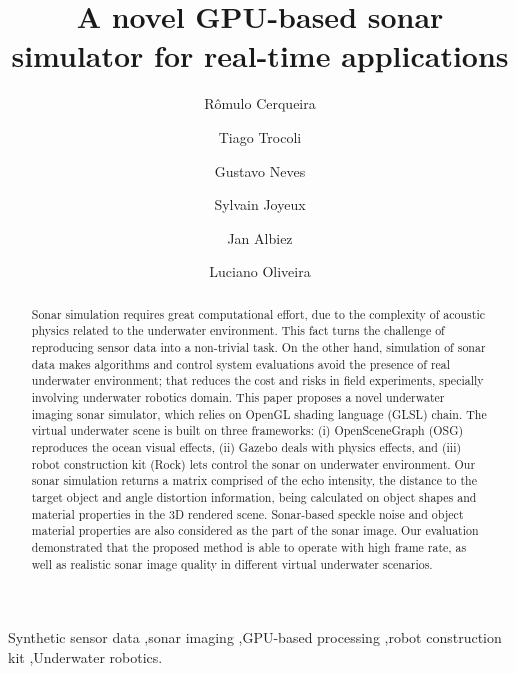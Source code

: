 \documentclass[final,5p,times]{elsarticle}
\begin{document}
\begin{frontmatter}


\title{A novel GPU-based sonar simulator for real-time applications}

\author[senai,ufba]{Rômulo Cerqueira} 
\author[senai]{Tiago Trocoli} 
\author[senai]{Gustavo Neves}
\author[senai]{Sylvain Joyeux}
\author[senai,dfki]{Jan Albiez}
\author[ufba]{Luciano Oliveira}

\address[senai]{Brazilian Institute of Robotics, SENAI CIMATEC, Salvador, Bahia, Brazil}
\address[ufba]{Intelligent Vision Research Lab, Federal University of Bahia, Salvador, Bahia, Brazil}
\address[dfki]{Robotics Innovation Center, DFKI GmbH, Bremen, Germany}

\begin{abstract}

Sonar simulation requires great computational effort, due to the complexity of acoustic physics related to the underwater environment. This fact turns the challenge of reproducing sensor data into a non-trivial task. On the other hand, simulation of sonar data makes algorithms and control system evaluations avoid the presence of real underwater environment; that reduces the cost and risks in field experiments, specially involving underwater robotics domain. This paper proposes a novel underwater imaging sonar simulator, which relies on OpenGL shading language (GLSL) chain. The virtual underwater scene is built on three frameworks: (i) OpenSceneGraph (OSG) reproduces the ocean visual effects, (ii) Gazebo deals with physics effects, and (iii) robot construction kit (Rock) lets control the sonar on underwater environment. Our sonar simulation returns a matrix comprised of the echo intensity, the distance to the target object and angle distortion information, being calculated on object shapes and material properties in the 3D rendered scene. Sonar-based speckle noise and object material properties are also considered as the part of the sonar image. Our evaluation demonstrated that the proposed method is able to operate with high frame rate, as well as realistic sonar image quality in different virtual underwater scenarios.

\end{abstract}

\begin{keyword}
Synthetic sensor data \sep sonar imaging  \sep GPU-based processing \sep robot construction kit \sep Underwater robotics.

\end{keyword}

\end{frontmatter}
\end{document}
